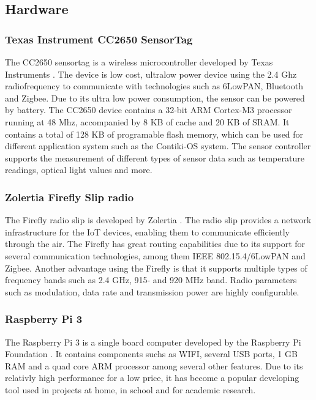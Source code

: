 \subsection{Hardware}

\subsubsection{Texas Instrument CC2650 SensorTag}
The CC2650 sensortag is a wireless microcontroller developed by Texas Instruments \cite{CC2650}. The device is low cost, ultralow power device using the 2.4 Ghz radiofrequency to communicate with technologies such as 6LowPAN, Bluetooth and Zigbee. Due to its ultra low power consumption, the sensor can be powered by battery.
The CC2650 device contains a 32-bit ARM Cortex-M3 processor running at 48 Mhz, accompanied by 8 KB of cache and 20 KB of SRAM. It contains a total of 128 KB of programable flash memory, which can be used for different application system such as the Contiki-OS system. The sensor controller supports the measurement of different types of sensor data such as temperature readings, optical light values and more. 


\subsubsection{Zolertia Firefly Slip radio}
The Firefly radio slip is developed by Zolertia \cite{Firefly}. The radio slip provides a network infrastructure for the IoT devices, enabling them to communicate efficiently through the air. The Firefly has great routing capabilities due to its support for several communication technologies, among them IEEE 802.15.4/6LowPAN and Zigbee. Another advantage using the Firefly is that it supports multiple types of frequency bands such as 2.4 GHz, 915- and 920 MHz band. Radio parameters such as modulation, data rate and transmission power are highly configurable.

\subsubsection{Raspberry Pi 3}
The Raspberry Pi 3 is a single board computer developed by the Raspberry Pi Foundation \cite{RP3}. It contains components suchs as WIFI, several USB ports, 1 GB RAM and a quad core ARM processor among several other features. Due to its relativly high performance for a low price, it has become a popular developing tool used in projects at home, in school and for academic research.
